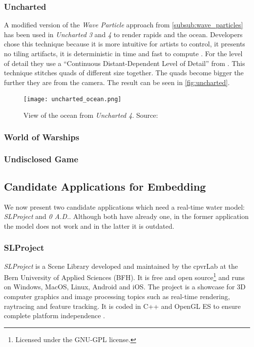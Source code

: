 \subsubsection{Uncharted}\label{subsub:uncharted}

A modified version of the \textit{Wave Particle} approach from
\autoref{subsub:wave_particles} has been used in \textit{Uncharted 3} and
\textit{4} to render rapids and the ocean. Developers chose this technique
because it is more intuitive for artists to control, it presents no tiling
artifacts, it is deterministic in time and fast to compute
\autocite{gonzalez2012water}. For the level of detail they use a ``Continuous
Distant-Dependent Level of Detail'' from \autocite{strugar2009continuous}. This
technique stitches quads of different size together. The quads become bigger the
further they are from the camera. The result can be seen in
\autoref{fig:uncharted}.

\begin{figure}[h]
    \centering
    \texttt{[image: uncharted\_ocean.png]}
    \caption{View of the ocean from \textit{Uncharted 4}. Source:
    \autocite{gonzalez2016rendering}}\label{fig:uncharted}
\end{figure}


\subsubsection{World of Warships}\label{subsub:world_of_warships}
\subsubsection{Undisclosed Game}\label{subsub:undisclosed_game}

\subsection{Candidate Applications for Embedding}\label{subsec:candidate_apps}

We now present two candidate applications which need a real-time water model:
\textit{SLProject} and \textit{0 A.D.}. Although both have already one,
in the former application the model does not work and in the latter it is
outdated.


\subsubsection{SLProject}

\textit{SLProject} is a Scene Library developed and maintained by the cpvrLab at
the Bern University of Applied Sciences (BFH). It is free and open
source\footnote{Licensed under the GNU-GPL license.} and runs on Windows, MacOS,
Linux, Android and iOS\@. The project is a showcase for 3D computer graphics and
image processing topics such as real-time rendering, raytracing and feature
tracking. It is coded in C++ and OpenGL ES to ensure complete platform
independence \autocite{hudritch2017slproject, slproject2017doxygen}.

